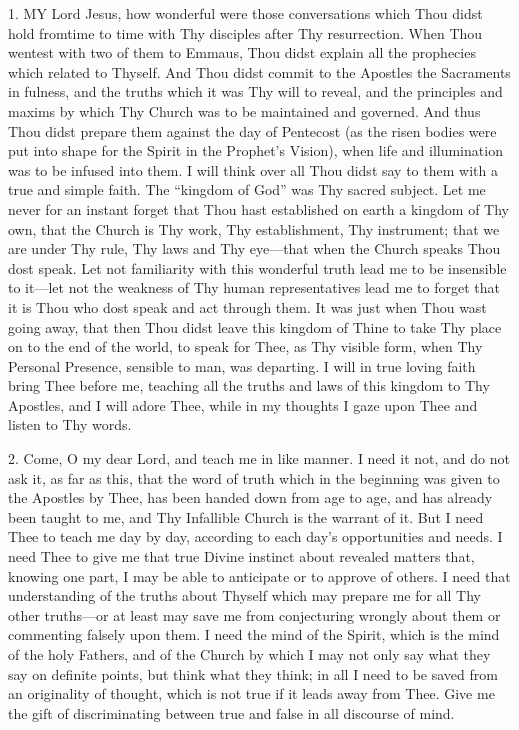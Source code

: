 1. MY
Lord Jesus, how wonderful were those conversations which Thou didst hold
from\emph{}time to time with Thy disciples after Thy resurrection. When
Thou wentest with two of them to Emmaus, Thou didst explain all the
prophecies which related to Thyself. And Thou didst commit to the
Apostles the Sacraments in fulness, and the truths which it was Thy will
to reveal, and the principles and maxims by which Thy Church was to be
maintained and governed. And thus Thou didst prepare them against the
day of Pentecost (as the risen bodies were put into shape for the Spirit
in the Prophet's Vision), when life and illumination was to be infused
into them. I will think over all Thou didst say to them with a true and
simple faith. The ``kingdom of God'' was Thy sacred subject. Let me never
for an instant forget that Thou hast established on earth a kingdom of
Thy own, that the Church is Thy work, Thy establishment, Thy instrument;
that we are under Thy rule, Thy laws and Thy eye—that when the Church speaks Thou dost speak. Let not familiarity with this wonderful
truth lead me to be insensible to it—let not the weakness of Thy human
representatives lead me to forget that it is Thou who dost speak and act
through them. It was just when Thou wast going away, that then Thou
didst leave this kingdom of Thine to take Thy place on to the end of the
world, to speak for Thee, as Thy visible form, when Thy Personal
Presence, sensible to man, was departing. I will in true loving faith
bring Thee before me, teaching all the truths and laws of this kingdom
to Thy Apostles, and I will adore Thee, while in my thoughts I gaze upon
Thee and listen to Thy words.

2. Come, O my dear Lord, and
teach me in like manner. I need it not, and do not ask it, as far as
this, that the word of truth which in the beginning was given to the
Apostles by Thee, has been handed down from age to age, and has already
been taught to me, and Thy Infallible Church is the warrant of it. But I
need Thee to teach me day by day, according to each day's opportunities
and needs. I need Thee to give me that true Divine instinct about
revealed matters that, knowing one part, I may be able to anticipate or
to approve of others. I need that understanding of the truths about
Thyself which may prepare me for all Thy other truths—or at least may
save me from conjecturing wrongly about them or commenting falsely upon
them. I need the mind of the Spirit, which is the mind of the holy
Fathers, and of the Church by which I may not only say what they say on
definite points, but think what they think; in all I need to be saved
from an originality of thought, which is not true if it leads away
from Thee. Give me the gift of discriminating between true and false in
all discourse of mind.

